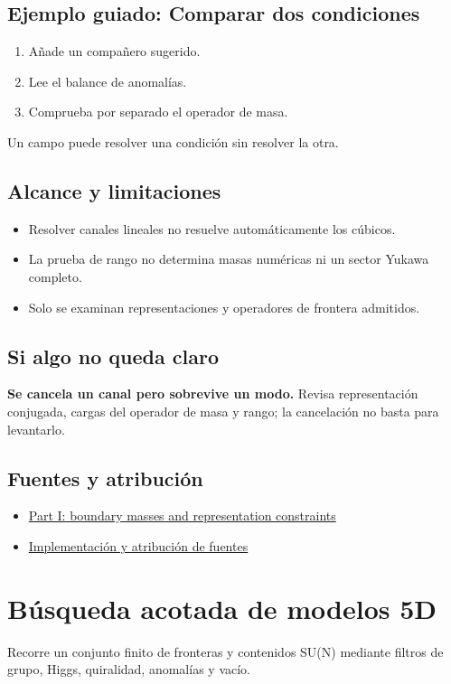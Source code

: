 \documentclass[11pt,a4paper]{article}
\begin{document}
\subsection*{Ejemplo guiado: Comparar dos condiciones}
\begin{enumerate}
\item Añade un compañero sugerido.
\item Lee el balance de anomalías.
\item Comprueba por separado el operador de masa.
\end{enumerate}
Un campo puede resolver una condición sin resolver la otra.
\subsection*{Alcance y limitaciones}
\begin{itemize}
\item Resolver canales lineales no resuelve automáticamente los cúbicos.
\item La prueba de rango no determina masas numéricas ni un sector Yukawa completo.
\item Solo se examinan representaciones y operadores de frontera admitidos.
\end{itemize}
\subsection*{Si algo no queda claro}
\textbf{Se cancela un canal pero sobrevive un modo.} Revisa representación conjugada, cargas del operador de masa y rango; la cancelación no basta para levantarlo.

\subsection*{Fuentes y atribución}
\begin{itemize}
\item \href{https://karlesmarin.github.io/ghu-explorer/papers/part-i/index.html}{Part I: boundary masses and representation constraints}
\item \href{https://github.com/karlesmarin/ghu-lab/blob/main/src/sections/brane_section.js}{Implementación y atribución de fuentes}
\end{itemize}
\section{Búsqueda acotada de modelos 5D}
Recorre un conjunto finito de fronteras y contenidos SU(N) mediante filtros de grupo, Higgs, quiralidad, anomalías y vacío.
\end{document}
